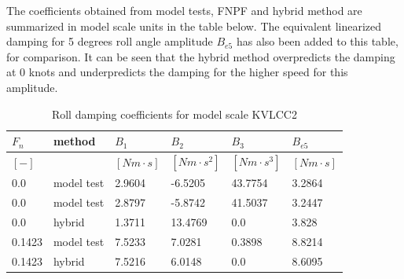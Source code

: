     The coefficients obtained from model tests, FNPF and hybrid method are
summarized in model scale units in the table below. The equivalent
linearized damping for 5 degrees roll angle amplitude $B_{e5}$ has
also been added to this table, for comparison. It can be seen that the
hybrid method overpredicts the damping at 0 knots and underpredicts the
damping for the higher speed for this amplitude.
 
            
    
    
\begin{table}[H]
\scriptsize
\center
\caption{Roll damping coefficients for model scale KVLCC2}
\label{tab:results}
\begin{tabular}{llllll}
\toprule\addlinespace
$F_n$ & method & $B_1$ & $B_2$ & $B_3$ & $B_{e5}$\\ 
\midrule$[-]$ &  & $[Nm \cdot s]$ & $[Nm \cdot s^2]$ & $[Nm \cdot s^3]$ & $[Nm \cdot s]$\\ 
0.0 & model test & 2.9604 & -6.5205 & 43.7754 & 3.2864\\ 
0.0 & model test & 2.8797 & -5.8742 & 41.5037 & 3.2447\\ 
0.0 & hybrid & 1.3711 & 13.4769 & 0.0 & 3.828\\ 
0.1423 & model test & 7.5233 & 7.0281 & 0.3898 & 8.8214\\ 
0.1423 & hybrid & 7.5216 & 6.0148 & 0.0 & 8.6095\\ 

\bottomrule
\end{tabular}
\end{table}

    

    